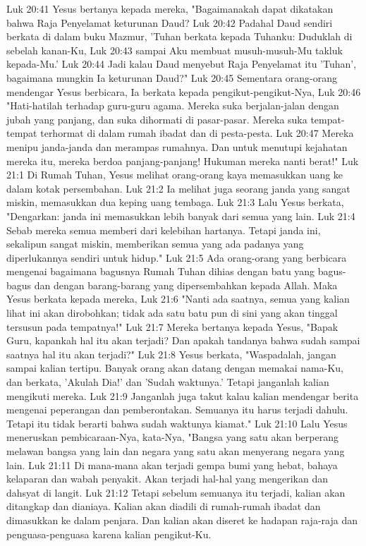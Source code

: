 Luk 20:41  Yesus bertanya kepada mereka, "Bagaimanakah dapat dikatakan bahwa Raja Penyelamat keturunan Daud?
Luk 20:42  Padahal Daud sendiri berkata di dalam buku Mazmur, 'Tuhan berkata kepada Tuhanku: Duduklah di sebelah kanan-Ku,
Luk 20:43  sampai Aku membuat musuh-musuh-Mu takluk kepada-Mu.'
Luk 20:44  Jadi kalau Daud menyebut Raja Penyelamat itu 'Tuhan', bagaimana mungkin Ia keturunan Daud?"
Luk 20:45  Sementara orang-orang mendengar Yesus berbicara, Ia berkata kepada pengikut-pengikut-Nya,
Luk 20:46  "Hati-hatilah terhadap guru-guru agama. Mereka suka berjalan-jalan dengan jubah yang panjang, dan suka dihormati di pasar-pasar. Mereka suka tempat-tempat terhormat di dalam rumah ibadat dan di pesta-pesta.
Luk 20:47  Mereka menipu janda-janda dan merampas rumahnya. Dan untuk menutupi kejahatan mereka itu, mereka berdoa panjang-panjang! Hukuman mereka nanti berat!"
Luk 21:1  Di Rumah Tuhan, Yesus melihat orang-orang kaya memasukkan uang ke dalam kotak persembahan.
Luk 21:2  Ia melihat juga seorang janda yang sangat miskin, memasukkan dua keping uang tembaga.
Luk 21:3  Lalu Yesus berkata, "Dengarkan: janda ini memasukkan lebih banyak dari semua yang lain.
Luk 21:4  Sebab mereka semua memberi dari kelebihan hartanya. Tetapi janda ini, sekalipun sangat miskin, memberikan semua yang ada padanya yang diperlukannya sendiri untuk hidup."
Luk 21:5  Ada orang-orang yang berbicara mengenai bagaimana bagusnya Rumah Tuhan dihias dengan batu yang bagus-bagus dan dengan barang-barang yang dipersembahkan kepada Allah. Maka Yesus berkata kepada mereka,
Luk 21:6  "Nanti ada saatnya, semua yang kalian lihat ini akan dirobohkan; tidak ada satu batu pun di sini yang akan tinggal tersusun pada tempatnya!"
Luk 21:7  Mereka bertanya kepada Yesus, "Bapak Guru, kapankah hal itu akan terjadi? Dan apakah tandanya bahwa sudah sampai saatnya hal itu akan terjadi?"
Luk 21:8  Yesus berkata, "Waspadalah, jangan sampai kalian tertipu. Banyak orang akan datang dengan memakai nama-Ku, dan berkata, 'Akulah Dia!' dan 'Sudah waktunya.' Tetapi janganlah kalian mengikuti mereka.
Luk 21:9  Janganlah juga takut kalau kalian mendengar berita mengenai peperangan dan pemberontakan. Semuanya itu harus terjadi dahulu. Tetapi itu tidak berarti bahwa sudah waktunya kiamat."
Luk 21:10  Lalu Yesus meneruskan pembicaraan-Nya, kata-Nya, "Bangsa yang satu akan berperang melawan bangsa yang lain dan negara yang satu akan menyerang negara yang lain.
Luk 21:11  Di mana-mana akan terjadi gempa bumi yang hebat, bahaya kelaparan dan wabah penyakit. Akan terjadi hal-hal yang mengerikan dan dahsyat di langit.
Luk 21:12  Tetapi sebelum semuanya itu terjadi, kalian akan ditangkap dan dianiaya. Kalian akan diadili di rumah-rumah ibadat dan dimasukkan ke dalam penjara. Dan kalian akan diseret ke hadapan raja-raja dan penguasa-penguasa karena kalian pengikut-Ku.
